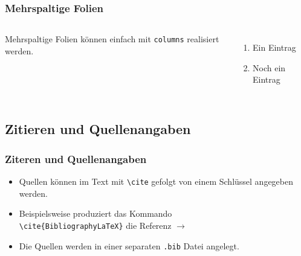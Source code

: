 \begin{frame}
	\frametitle{Mehrspaltige Folien}
	\begin{columns}
		Mehrspaltige Folien können einfach mit \texttt{columns} realisiert werden.
		\begin{enumerate}
			\item Ein Eintrag
			\item Noch ein Eintrag
		\end{enumerate}
	\end{columns}
\end{frame}

\subsection{Zitieren und Quellenangaben}


\begin{frame}[fragile]
	\frametitle{Ziteren und Quellenangaben}
	
	\begin{itemize}
		\item Quellen können im Text mit \verb|\cite| gefolgt von einem Schlüssel angegeben werden.
		\item Beispielsweise produziert das Kommando\\ \verb|\cite{BibliographyLaTeX}|
		 die Referenz $\rightarrow$ \cite{BibliographyLaTeX}
		 \item Die Quellen werden in einer separaten \texttt{.bib} Datei angelegt.
	\end{itemize}
	
\end{frame}